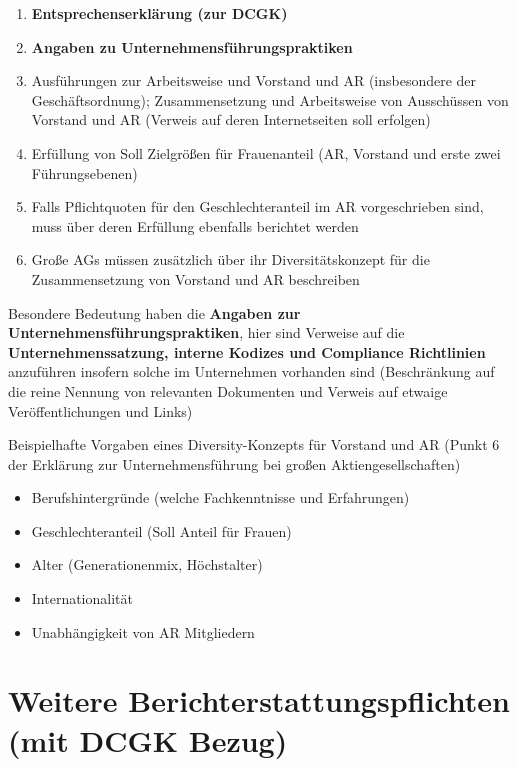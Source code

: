 \documentclass[
]{article}
\providecommand{\tightlist}{%
  \setlength{\itemsep}{0pt}\setlength{\parskip}{0pt}}
\begin{document}
\begin{enumerate}
\def\labelenumi{\arabic{enumi}.}
\item
  \textbf{Entsprechenserklärung (zur DCGK)}
\item
  \textbf{Angaben zu Unternehmensführungspraktiken}
\item
  Ausführungen zur Arbeitsweise und Vorstand und AR (insbesondere der
  Geschäftsordnung); Zusammensetzung und Arbeitsweise von Ausschüssen
  von Vorstand und AR (Verweis auf deren Internetseiten soll erfolgen)
\item
  Erfüllung von Soll Zielgrößen für Frauenanteil (AR, Vorstand und erste
  zwei Führungsebenen)
\item
  Falls Pflichtquoten für den Geschlechteranteil im AR vorgeschrieben
  sind, muss über deren Erfüllung ebenfalls berichtet werden
\item
  Große AGs müssen zusätzlich über ihr Diversitätskonzept für die
  Zusammensetzung von Vorstand und AR beschreiben
\end{enumerate}

Besondere Bedeutung haben die \textbf{Angaben zur
Unternehmensführungspraktiken}, hier sind Verweise auf die
\textbf{Unternehmenssatzung, interne Kodizes und Compliance Richtlinien
}anzuführen insofern solche im Unternehmen vorhanden sind (Beschränkung
auf die reine Nennung von relevanten Dokumenten und Verweis auf etwaige
Veröffentlichungen und Links)

Beispielhafte Vorgaben eines Diversity-Konzepts für Vorstand und AR
(Punkt 6 der Erklärung zur Unternehmensführung bei großen
Aktiengesellschaften)

\begin{itemize}
\tightlist
\item
  Berufshintergründe (welche Fachkenntnisse und Erfahrungen)
\item
  Geschlechteranteil (Soll Anteil für Frauen)
\item
  Alter (Generationenmix, Höchstalter)
\item
  Internationalität
\item
  Unabhängigkeit von AR Mitgliedern
\end{itemize}

\hypertarget{weitere-berichterstattungspflichten-mit-dcgk-bezug}{%
\section{Weitere Berichterstattungspflichten (mit DCGK
Bezug)}\label{weitere-berichterstattungspflichten-mit-dcgk-bezug}}
\end{document}
